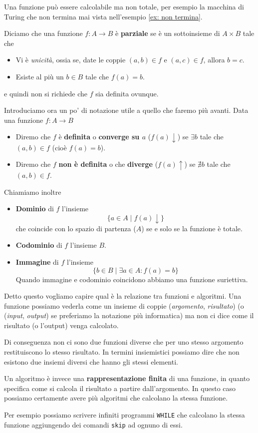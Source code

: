 Una funzione può essere calcolabile ma non totale, per esempio
la macchina di Turing che non termina mai vista nell'esempio
\ref{ex: non termina}.

\begin{definition} \label{def: funzione parziale}
	Diciamo che una funzione $f : A \to B$ è \textbf{parziale}
	se è un sottoinsieme di $A \times B$ tale che
	\begin{itemize}
		\item Vi è \emph{unicità}, ossia se, date le coppie
		      $(a, b) \in f$ e $(a, c) \in f$, allora $b = c$.
		\item Esiste al più un $b \in B$ tale che $f(a) = b$.
	\end{itemize}
	e quindi non si richiede che $f$ sia definita ovunque.
\end{definition}

Introduciamo ora un po' di notazione utile a quello che faremo
più avanti. Data una funzione $f : A \to B$
\begin{itemize}
	\item Diremo che $f$ è \textbf{definita} o
	      \textbf{converge su $a$} ($f(a) \downarrow$) se
	      $\exists b$ tale che $(a, b) \in f$ (cioè
	      $f(a) = b$).
	\item Diremo che $f$ \textbf{non è definita} o che
	      \textbf{diverge} ($f(a) \uparrow$) se $\nexists b$
	      tale che $(a, b) \in f$.
\end{itemize}
Chiamiamo inoltre
\begin{itemize}
	\item \textbf{Dominio} di $f$ l'insieme
	      \[ \{ a \in A \; | \; f(a) \downarrow \} \]
	      che coincide con lo spazio di partenza ($A$) se e
	      solo se la funzione è totale.
	\item \textbf{Codominio} di $f$ l'insieme $B$.
	\item \textbf{Immagine} di $f$ l'insieme
	      \[ \{ b \in B \; | \; \exists a \in A : f(a) = b \} \]
	      Quando immagine e codominio coincidono abbiamo una
	      funzione suriettiva.
\end{itemize}

Detto questo vogliamo capire qual è la relazione tra funzioni
e algoritmi. Una funzione possiamo vederla come un insieme di
coppie (\emph{argomento}, \emph{risultato}) (o (\emph{input},
\emph{output}) se preferiamo la notazione più informatica) ma
non ci dice come il risultato (o l'output) venga calcolato.

Di conseguenza non ci sono due funzioni diverse che per uno
stesso argomento restituiscono lo stesso risultato. In termini
insiemistici possiamo dire che non esistono due insiemi diversi
che hanno gli stessi elementi.
\begin{tcolorbox}
	Un algoritmo è invece una \textbf{rappresentazione finita}
	di una funzione, in quanto specifica come si calcola il
	risultato a partire dall'argomento. In questo caso possiamo
	certamente avere più algoritmi che calcolano la stessa
	funzione.
\end{tcolorbox}
Per esempio possiamo scrivere infiniti programmi \verb|WHILE|
che calcolano la stessa funzione aggiungendo dei comandi
\verb|skip| ad ognuno di essi.

